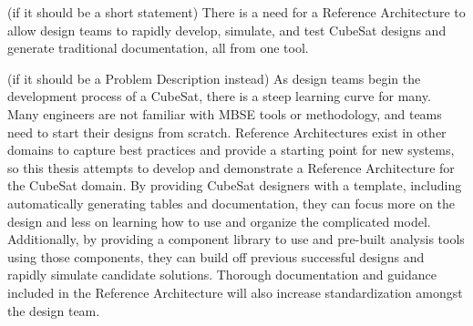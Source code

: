 (if it should be a short statement)
There is a need for a Reference Architecture to allow design teams to rapidly develop, simulate, and test CubeSat designs and generate traditional documentation, all from one  tool.

(if it should be a Problem Description instead)
As design teams begin the development process of a CubeSat, there is a steep learning curve for many. Many engineers are not familiar with MBSE tools or methodology, and teams need to start their designs from scratch. Reference Architectures exist in other domains to capture best practices and provide a starting point for new systems, so this thesis attempts to develop and demonstrate a Reference Architecture for the CubeSat domain. By providing CubeSat designers with a template, including automatically generating tables and documentation, they can focus more on the design and less on learning how to use and organize the complicated model. Additionally, by providing a component library to use and pre-built analysis tools using those components, they can build off previous successful designs and rapidly simulate candidate solutions. Thorough documentation and guidance included in the Reference Architecture will also increase standardization amongst the design team. 